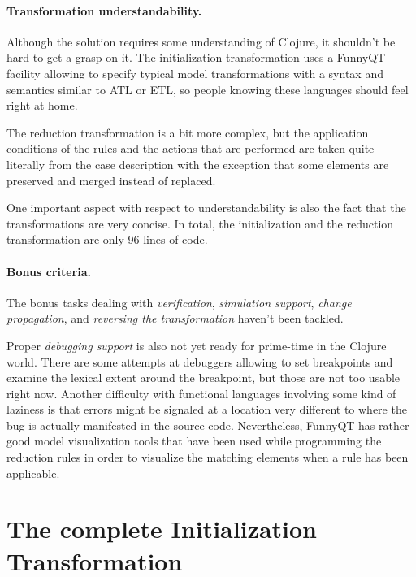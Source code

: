 \documentclass[submission]{eptcs}
\begin{document}
\paragraph{Transformation understandability.}

Although the solution requires some understanding of Clojure, it shouldn't be
hard to get a grasp on it.  The initialization transformation uses a FunnyQT
facility allowing to specify typical model transformations with a syntax and
semantics similar to ATL or ETL, so people knowing these languages should feel
right at home.

The reduction transformation is a bit more complex, but the application
conditions of the rules and the actions that are performed are taken quite
literally from the case description with the exception that some elements are
preserved and merged instead of replaced.

One important aspect with respect to understandability is also the fact that
the transformations are very concise.  In total, the initialization and the
reduction transformation are only 96 lines of code.

\paragraph{Bonus criteria.}

The bonus tasks dealing with \emph{verification}, \emph{simulation support},
\emph{change propagation}, and \emph{reversing the transformation} haven't been
tackled.

Proper \emph{debugging support} is also not yet ready for prime-time in the
Clojure world.  There are some attempts at debuggers allowing to set
breakpoints and examine the lexical extent around the breakpoint, but those are
not too usable right now.  Another difficulty with functional languages
involving some kind of laziness is that errors might be signaled at a location
very different to where the bug is actually manifested in the source code.
Nevertheless, FunnyQT has rather good model visualization tools that have been
used while programming the reduction rules in order to visualize the matching
elements when a rule has been applicable.





\appendix
\newpage

\section{The complete Initialization Transformation}
\label{sec:init-code}
\end{document}
